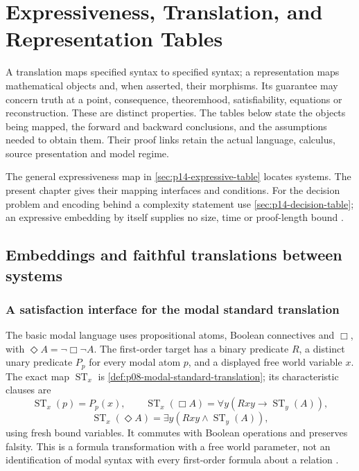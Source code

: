\chapter{Expressiveness, Translation, and Representation Tables}
\label{sec:p14-expressiveness-and-representation}

A translation maps specified syntax to specified syntax; a representation
maps mathematical objects and, when asserted, their morphisms. Its guarantee
may concern truth at a point, consequence, theoremhood, satisfiability,
equations or reconstruction. These are distinct properties. The tables below
state the objects being mapped, the forward and backward conclusions, and
the assumptions needed to obtain them. Their proof links retain the actual
language, calculus, source presentation and model regime.

The general expressiveness map in \cref{sec:p14-expressive-table} locates
systems. The present chapter gives their mapping interfaces and conditions.
For the decision problem and encoding behind a complexity statement use
\cref{sec:p14-decision-table}; an expressive embedding by itself supplies
no size, time or proof-length bound \cite{Enderton2001,Libkin2004,
BlackburnDeRijkeVenema2001}.

\section{Embeddings and faithful translations between systems}
\label{sec:p14-translation-embeddings}


\subsection{A satisfaction interface for the modal standard translation}
\label{sec:p14-translation-standard-interface}

The basic modal language uses propositional atoms, Boolean connectives and
\(\Box\), with \(\Diamond A=\neg\Box\neg A\). The first-order target
has a binary predicate \(R\), a distinct unary predicate \(P_p\) for
every modal atom \(p\), and a displayed free world variable \(x\).
The exact map \(\operatorname{ST}_x\) is
\cref{def:p08-modal-standard-translation}; its characteristic clauses are
\[
 \operatorname{ST}_x(p)=P_p(x),\qquad
 \operatorname{ST}_x(\Box A)=
       \forall y(Rxy\to\operatorname{ST}_y(A)),
\]
\[
 \operatorname{ST}_x(\Diamond A)=
       \exists y(Rxy\land\operatorname{ST}_y(A)),
\]
using fresh bound variables. It commutes with Boolean operations and
preserves falsity. This is a formula transformation with a free world
parameter, not an identification of modal syntax with every first-order
formula about a relation \cite{BlackburnDeRijkeVenema2001}.

